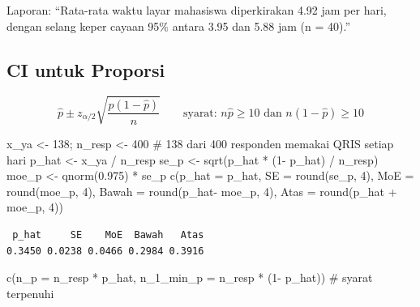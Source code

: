 \documentclass[
  indonesian,
  letterpaper,
]{book}
\newenvironment{Shaded}{\begin{snugshade}}{\end{snugshade}}
\newcommand{\AttributeTok}[1]{\textcolor[rgb]{0.40,0.45,0.13}{#1}}
\newcommand{\CommentTok}[1]{\textcolor[rgb]{0.37,0.37,0.37}{#1}}
\newcommand{\DecValTok}[1]{\textcolor[rgb]{0.68,0.00,0.00}{#1}}
\newcommand{\FloatTok}[1]{\textcolor[rgb]{0.68,0.00,0.00}{#1}}
\newcommand{\FunctionTok}[1]{\textcolor[rgb]{0.28,0.35,0.67}{#1}}
\newcommand{\NormalTok}[1]{\textcolor[rgb]{0.00,0.23,0.31}{#1}}
\newcommand{\OtherTok}[1]{\textcolor[rgb]{0.00,0.23,0.31}{#1}}
\newcommand{\SpecialCharTok}[1]{\textcolor[rgb]{0.37,0.37,0.37}{#1}}
\begin{document}
Laporan: ``Rata-rata waktu layar mahasiswa diperkirakan 4.92 jam per
hari, dengan selang keper cayaan 95\% antara 3.95 dan 5.88 jam (n =
40).''

\subsection{CI untuk Proporsi}\label{ci-untuk-proporsi}

\[
\hat{p} \pm z_{\alpha/2} \sqrt{\frac{\hat{p}(1-\hat{p})}{n}}
\qquad \text{syarat: } n\hat{p} \geq 10 \text{ dan } n(1-\hat{p}) \geq 10
\]

\begin{Shaded}
\begin{Highlighting}[]
\NormalTok{x\_ya }\OtherTok{\textless{}{-}} \DecValTok{138}\NormalTok{; n\_resp }\OtherTok{\textless{}{-}} \DecValTok{400}
\CommentTok{\# 138 dari 400 responden memakai QRIS setiap hari}
\NormalTok{p\_hat }\OtherTok{\textless{}{-}}\NormalTok{ x\_ya }\SpecialCharTok{/}\NormalTok{ n\_resp}
\NormalTok{se\_p }\OtherTok{\textless{}{-}} \FunctionTok{sqrt}\NormalTok{(p\_hat }\SpecialCharTok{*}\NormalTok{ (}\DecValTok{1}\SpecialCharTok{{-}}\NormalTok{ p\_hat) }\SpecialCharTok{/}\NormalTok{ n\_resp)}
\NormalTok{moe\_p }\OtherTok{\textless{}{-}} \FunctionTok{qnorm}\NormalTok{(}\FloatTok{0.975}\NormalTok{) }\SpecialCharTok{*}\NormalTok{ se\_p}
\FunctionTok{c}\NormalTok{(}\AttributeTok{p\_hat =}\NormalTok{ p\_hat, }\AttributeTok{SE =} \FunctionTok{round}\NormalTok{(se\_p, }\DecValTok{4}\NormalTok{), }\AttributeTok{MoE =} \FunctionTok{round}\NormalTok{(moe\_p, }\DecValTok{4}\NormalTok{),}
\AttributeTok{Bawah =} \FunctionTok{round}\NormalTok{(p\_hat}\SpecialCharTok{{-}}\NormalTok{ moe\_p, }\DecValTok{4}\NormalTok{), }\AttributeTok{Atas =} \FunctionTok{round}\NormalTok{(p\_hat }\SpecialCharTok{+}\NormalTok{ moe\_p, }\DecValTok{4}\NormalTok{))}
\end{Highlighting}
\end{Shaded}

\begin{verbatim}
 p_hat     SE    MoE  Bawah   Atas 
0.3450 0.0238 0.0466 0.2984 0.3916 
\end{verbatim}

\begin{Shaded}
\begin{Highlighting}[]
\FunctionTok{c}\NormalTok{(}\AttributeTok{n\_p =}\NormalTok{ n\_resp }\SpecialCharTok{*}\NormalTok{ p\_hat, }\AttributeTok{n\_1\_min\_p =}\NormalTok{ n\_resp }\SpecialCharTok{*}\NormalTok{ (}\DecValTok{1}\SpecialCharTok{{-}}\NormalTok{ p\_hat)) }\CommentTok{\# syarat terpenuhi}
\end{Highlighting}
\end{Shaded}
\end{document}
